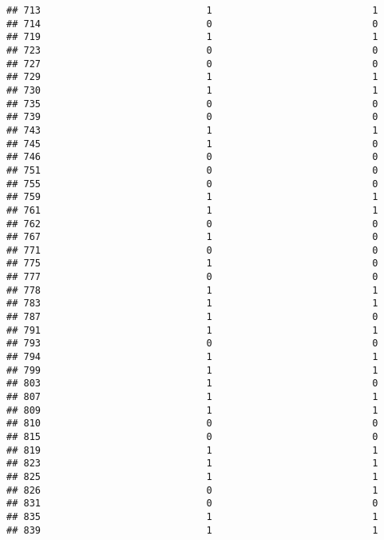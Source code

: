 \documentclass[
]{article}
\begin{document}
\begin{verbatim}
## 713                             1                            1
## 714                             0                            0
## 719                             1                            1
## 723                             0                            0
## 727                             0                            0
## 729                             1                            1
## 730                             1                            1
## 735                             0                            0
## 739                             0                            0
## 743                             1                            1
## 745                             1                            0
## 746                             0                            0
## 751                             0                            0
## 755                             0                            0
## 759                             1                            1
## 761                             1                            1
## 762                             0                            0
## 767                             1                            0
## 771                             0                            0
## 775                             1                            0
## 777                             0                            0
## 778                             1                            1
## 783                             1                            1
## 787                             1                            0
## 791                             1                            1
## 793                             0                            0
## 794                             1                            1
## 799                             1                            1
## 803                             1                            0
## 807                             1                            1
## 809                             1                            1
## 810                             0                            0
## 815                             0                            0
## 819                             1                            1
## 823                             1                            1
## 825                             1                            1
## 826                             0                            1
## 831                             0                            0
## 835                             1                            1
## 839                             1                            1

\end{verbatim}
\end{document}
